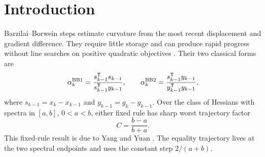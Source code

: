 \documentclass[letterpaper,twoside]{article}
\begin{document}
\begin{abstract}
We study gradient methods that recompute a BB1 or BB2 stepsize at every iteration according to a prescribed periodic pattern. On positive definite quadratics with spectra in $[a,b]$, either fixed rule has sharp worst-case asymptotic gradient factor $C=(b-a)/(b+a)$. Every pattern using both rules has a strictly smaller uniform asymptotic threshold. Near condition number one, we determine the leading improvement: $C-Q_{\bm\sigma}=K_{\bm\sigma}C^3+O(C^4)$. Here $Q_{\bm\sigma}$ denotes either the supremum of the finite-dimensional trajectory factors or the threshold for a geometric bound uniform over all admissible finite-dimensional problems. The remainder is independent of the pattern and its period. The coefficient is half the variance of an explicit periodic linear response; alternation gives $K_{01}=1/32$. The proof characterizes equality at the spectral endpoints and estimates how the interior spectrum affects the worst-case factor near condition number one. Away from this limit, interior cycles can be slower than the endpoint construction. Numerical experiments compare the methods under a fixed iteration budget.
\end{abstract}

\section{Introduction}
Barzilai--Borwein steps estimate curvature from the most recent displacement and gradient difference. They require little storage and can produce rapid progress without line searches on positive quadratic objectives \cite{BarzilaiBorwein1988,Raydan1993,DaiLiao2002}. Their two classical forms are
\begin{equation}\label{eq:bb}
 \alpha_k^{\rm BB1}=\frac{s_{k-1}^{\mathsf T}s_{k-1}}{s_{k-1}^{\mathsf T}y_{k-1}},
 \qquad
 \alpha_k^{\rm BB2}=\frac{s_{k-1}^{\mathsf T}y_{k-1}}{y_{k-1}^{\mathsf T}y_{k-1}},
\end{equation}
where $s_{k-1}=x_k-x_{k-1}$ and $y_{k-1}=g_k-g_{k-1}$.
Over the class of Hessians with spectra in $[a,b]$, $0<a<b$, either fixed rule has sharp worst trajectory factor
\[
 C=\frac{b-a}{b+a}.
\]
This fixed-rule result is due to Yang and Yuan \cite{YangYuan2026}. The equality trajectory lives at the two spectral endpoints and uses the constant step $2/(a+b)$.
\end{document}
